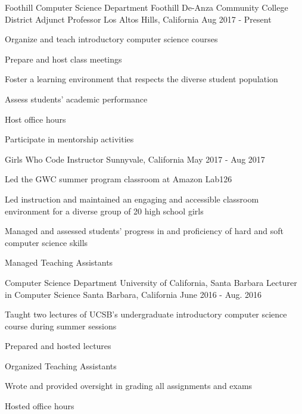 \begin{cventries}

  \cventry
{Foothill Computer Science Department \newline Foothill De-Anza Community College District}
    {Adjunct Professor}
    {Los Altos Hills, California}
    {Aug 2017 - Present}
    {
      \begin{cvitems}
	\item {Organize and teach introductory computer science courses}\\
	\begin{cvitems}
         \item Prepare and host class meetings
                  \item Foster a learning environment that respects the diverse student population
		\item Assess students' academic performance
		\item Host office hours
	\end{cvitems}
	\vspace{2mm}
	\item Participate in mentorship activities
      \end{cvitems}
    }

  \cventry
{Girls Who Code}
    {Instructor}
    {Sunnyvale, California}
    {May 2017 - Aug 2017}
    {
      \begin{cvitems}
	\item {Led the GWC summer program classroom at Amazon Lab126}\\
	\begin{cvitems}
        \item Led instruction and maintained an engaging and accessible classroom environment for a diverse group of 20 high school girls
	\item Managed and assessed students’ progress in and proficiency of hard and soft computer science skills
	\item Managed Teaching Assistants
	\end{cvitems}
      \end{cvitems}
    }

  \cventry
{Computer Science Department \newline University of California, Santa Barbara}
    {Lecturer in Computer Science}
    {Santa Barbara, California}
    {June 2016 - Aug. 2016}
    {
      \begin{cvitems}
	\item {Taught two lectures of UCSB's undergraduate introductory computer science course during summer sessions}\\
	\begin{cvitems}
        \item Prepared and hosted lectures
	\item Organized Teaching Assistants
	\item Wrote and provided oversight in grading all assignments and exams
	\item Hosted office hours 
	\end{cvitems}
      \end{cvitems}
    }


\end{cventries}
